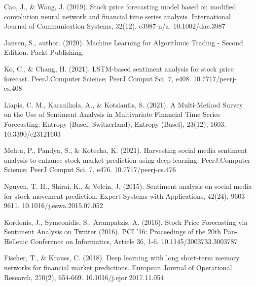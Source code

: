\documentclass{llncs}
\begin{document}
%
%
%
% 
% 
%

\newpage

\begin{thebibliography}{8}

\label{ref_article1} 
Cao, J., \& Wang, J. (2019). Stock price forecasting model based on modified convolution neural network and financial time series analysis. International Journal of Communication Systems, 32(12), e3987-n/a. 10.1002/dac.3987

\label{ref_article2} 
Jansen, S., author. (2020). Machine Learning for Algorithmic Trading - Second Edition. Packt Publishing.

\label{ref_article3} 
Ko, C., \& Chang, H. (2021). LSTM-based sentiment analysis for stock price forecast. PeerJ.Computer Science; PeerJ Comput Sci, 7, e408. 10.7717/peerj-cs.408

\label{ref_article4} 
Liapis, C. M., Karanikola, A., \& Kotsiantis, S. (2021). A Multi-Method Survey on the Use of Sentiment Analysis in Multivariate Financial Time Series Forecasting. Entropy (Basel, Switzerland); Entropy (Basel), 23(12), 1603. 10.3390/e23121603

\label{ref_article5} 
Mehta, P., Pandya, S., \& Kotecha, K. (2021). Harvesting social media sentiment analysis to enhance stock market prediction using deep learning. PeerJ.Computer Science; PeerJ Comput Sci, 7, e476. 10.7717/peerj-cs.476

\label{ref_article6} 
Nguyen, T. H., Shirai, K., \& Velcin, J. (2015). Sentiment analysis on social media for stock movement prediction. Expert Systems with Applications, 42(24), 9603-9611. 10.1016/j.eswa.2015.07.052

\label{ref_article7} 
Kordonis, J., Symeonidis, S., Arampatzis, A. (2016). Stock Price Forecasting via Sentiment Analysis on Twitter (2016). PCI ’16: Proceedings of the 20th Pan-Hellenic Conference on Informatics, Article 36, 1-6. 10.1145/3003733.3003787

\label{ref_article8} 
Fischer, T., \& Krauss, C. (2018). Deep learning with long short-term memory networks for financial market predictions. European Journal of Operational Research, 270(2), 654-669. 10.1016/j.ejor.2017.11.054


\end{thebibliography}
\end{document}

